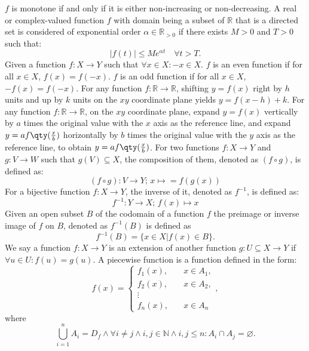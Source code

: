 \documentclass[a4paper,12pt]{report}
\begin{document}
$f$ is monotone if and only if it is either non-increasing or non-decreasing.
A real or complex-valued function $f$ with domain being a subset of $\mathbb{R}$ that is a directed set is considered of exponential order $\alpha\in\mathbb{R}_{>0}$ if there exists $M>0$ and $T>0$ such that:
\[|f(t)|\leq Me^{\alpha t}\quad \forall t>T.\]
Given a function $f\colon X\to Y$ such that $\forall x\in X\colon -x\in X$.
$f$ is an even function if for all $x\in X$, $f(x)=f(-x)$.
$f$ is an odd function if for all $x\in X$, $-f(x)=f(-x)$.
For any function $f\colon\mathbb{R}\to\mathbb{R}$, shifting $y=f(x)$ right by $h$ units and up by $k$ units on the $xy$ coordinate plane yields $y=f(x-h)+k$.
For any function $f\colon\mathbb{R}\to\mathbb{R}$, on the $xy$ coordinate plane, expand $y=f(x)$ vertically by $a$ times the original value with the $x$ axis as the reference line, and expand $y=af\qty(\frac{x}{b})$ horizontally by $b$ times the original value with the $y$ axis as the reference line, to obtain $y=af\qty(\frac{x}{b})$.
For two functions $f\colon X\to Y$ and $g\colon V\to W$ such that $g(V)\subseteq X$, the composition of them, denoted as $(f\circ g)$, is defined as:
\[(f \circ g)\colon V\to Y;\,x\mapsto = f(g(x))\]
For a bijective function $f\colon X\to Y$, the inverse of it, denoted as $f^{-1}$, is defined as:
\[f^{-1}\colon Y\to X;\,f(x)\mapsto x\]
Given an open subset $B$ of the codomain of a function $f$ the preimage or inverse image of $f$ on $B$, denoted as $f^{-1}(B)$ is defined as
\[f^{-1}(B)=\{x\in X|f(x)\in B\}.\]
We say a function $f\colon X\to Y$ is an extension of another function $g\colon U\subseteq X\to Y$ if $\forall u\in U\colon f(u)=g(u)$.
A piecewise function is a function defined in the form:
\[f(x) =
\begin{cases}
f_1(x), & \quad x\in A_1, \\
f_2(x), & \quad x\in A_2, \\
\vdots \\
f_n(x), & \quad x \in A_n
\end{cases},\]
where
\[\bigcup_{i=1}^nA_i=D_f\land\forall i\neq j\land i,j\in\mathbb{N}\land i,j\leq n\colon A_i\cap A_j=\varnothing.\]
\end{document}
